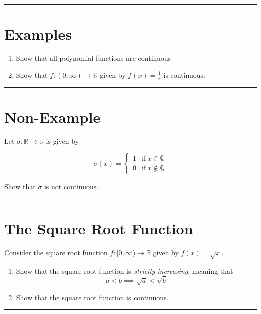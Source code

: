 \documentclass[12pt]{amsart}
\newcommand{\sep}[1]{\noindent\rule{\textwidth}{#1pt}}
\newcommand{\R}{\mathbb{R}}
\newcommand{\Q}{\mathbb{Q}}
\begin{document}
\sep{2}

\section{Examples}%
\label{sec:examples}

\begin{enumerate}[label=(\alph*)]
  \item Show that all polynomial functions are continuous
  \item Show that $f:(0,\infty)\rightarrow\R$ given by $f(x)=\frac{1}{x}$ is
    continuous.
\end{enumerate}

\sep{2}

\section{Non-Example}%
\label{sec:non_example}

Let $\sigma:\R\rightarrow\R$ is given by

\begin{equation*}\label{eq:4.1}
  \sigma(x)=\begin{cases}
    1 & \text{if}\ x\in\Q \\
    0 & \text{if}\ x\notin\Q
  \end{cases}
\end{equation*}

Show that $\sigma$ is not continuous.

\sep{2}

\section{The Square Root Function}%
\label{sec:the_square_root_function}

Consider the square root function $f:[0,\infty)\rightarrow\R$ given by
$f(x)=\sqrt{x}$.

\begin{enumerate}[label=(\alph*)]
  \item Show that the square root function is \textit{strictly increasing},
    meaning that
    \begin{equation*}\label{eq:5a.0}
      a<b\implies\sqrt{a}<\sqrt{b}
    \end{equation*}
  \item Show that the square root function is continuous.
\end{enumerate}

\sep{2}
\end{document}
